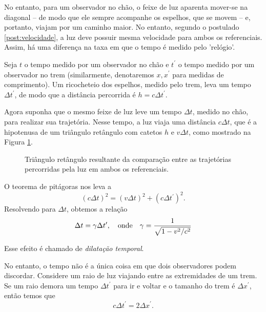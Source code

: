 No entanto, para um observador no chão, o feixe de luz aparenta mover-se na diagonal -- de modo que ele sempre acompanhe os espelhos, que se movem -- e, portanto, viajam por um caminho maior. No entanto, segundo o postulado \ref{post:velocidade}, a luz deve possuir mesma velocidade para ambos os referenciais. Assim, há uma diferença na taxa em que o tempo é medido pelo 'relógio'.

Seja $t$ o tempo medido por um observador no chão e $t^\prime$ o tempo medido por um observador no trem (similarmente, denotaremos $x, x^\prime$ para medidas de comprimento). Um ricocheteio dos espelhos, medido pelo trem, leva um tempo $\Delta t^\prime$, de modo que a distância percorrida é $h = c\Delta t^\prime$.

Agora suponha que o mesmo feixe de luz leve um tempo $\Delta t$, medido no chão, para realizar sua trajetória. Nesse tempo, a luz viaja uma distância $c\Delta t$, que é a hipotenusa de um triângulo retângulo com catetos $h$ e $v\Delta t$, como mostrado na Figura \ref{fig:Pitagoras}.
\begin{figure}[ht]
    \centering
    \caption{Triângulo retângulo resultante da comparação entre as trajetórias percorridas pela luz em ambos os referenciais.}
    \label{fig:Pitagoras}
\end{figure}

O teorema de pitágoras nos leva a 
\[
\left(c\Delta t\right)^2 = \left(v\Delta t\right)^2 + \left( c \Delta t^\prime \right) ^2 .
\]
Resolvendo para $\Delta t$, obtemos a relação
\begin{equation}\label{eq:DilatacaoTemporal}
    \Delta t = \gamma\Delta t^\prime, \qq{onde} \gamma=\frac{1}{\sqrt{1-v^2/c^2}}
\end{equation}

Esse efeito é chamado de \textit{dilatação temporal}.

No entanto, o tempo não é a única coisa em que dois observadores podem discordar. Considere um raio de luz viajando entre as extremidades de um trem. Se um raio demora um tempo $\Delta t^\prime$ para ir e voltar e o tamanho do trem é $\Delta x^\prime$, então temos que 
\begin{equation}\label{eq:RelacaoXlinhaTlinha}
    c\Delta t^\prime = 2\Delta x^\prime .
\end{equation}


